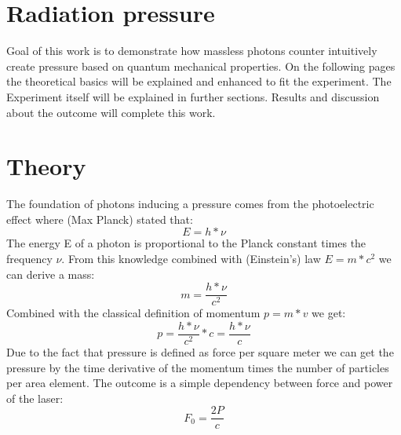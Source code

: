 \documentclass[12pt,a4paper]{article}
\begin{document}

\pagebreak
\setlength{\columnsep}{20pt}
\begin{multicols}{2}

\begin{abstract}

\end{abstract}

%

\section{Radiation pressure}
Goal of this work is to demonstrate how massless photons counter intuitively create pressure based on quantum mechanical
properties.
On the following pages the theoretical basics will be explained and enhanced to fit the experiment.
The Experiment itself will be explained in further sections. Results and discussion about the outcome
will complete this work.

\section{Theory}
\label{theory}
The foundation of photons inducing a pressure comes from the photoelectric effect where (Max Planck) stated that:
$$E = h * \nu$$
The energy E of a photon is proportional to the Planck constant times the frequency $\nu$.
From this knowledge combined with (Einstein's) law $E = m * c^2$ we can derive a mass:
$$m = \frac{h * \nu}{c^2}$$
Combined with the classical definition of momentum $p = m * v$ we get:
$$p = \frac{h * \nu}{c^2} * c = \frac{h * \nu}{c}$$
Due to the fact that pressure is defined as force per square meter we can get the pressure by the time derivative of the momentum times the number of particles per area element. The outcome is a simple dependency between force and power of the laser:
$$F_0 = \frac{2P}{c}$$


\end{multicols}
\end{document}
